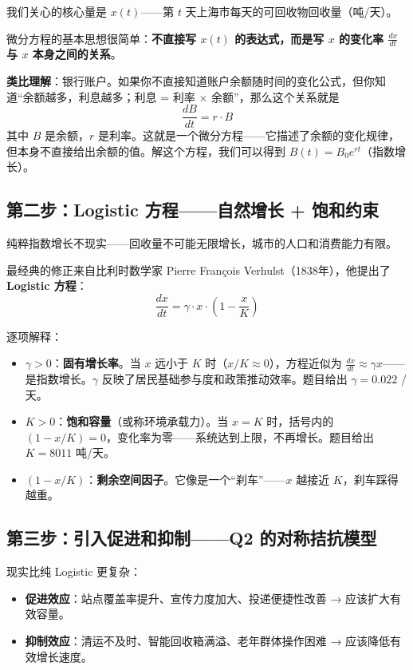 \documentclass[12pt,a4paper]{article}
\begin{document}
我们关心的核心量是 $x(t)$——第 $t$ 天上海市每天的可回收物回收量（吨/天）。

微分方程的基本思想很简单：\textbf{不直接写 $x(t)$ 的表达式，而是写 $x$ 的变化率 $\frac{dx}{dt}$ 与 $x$ 本身之间的关系}。

\medskip
\textbf{类比理解}：银行账户。如果你不直接知道账户余额随时间的变化公式，但你知道``余额越多，利息越多；利息 = 利率 $\times$ 余额''，那么这个关系就是
\[
\frac{dB}{dt} = r \cdot B
\]
其中 $B$ 是余额，$r$ 是利率。这就是一个微分方程——它描述了余额的变化规律，但本身不直接给出余额的值。解这个方程，我们可以得到 $B(t) = B_0 e^{rt}$（指数增长）。

\subsection{第二步：Logistic 方程——自然增长 + 饱和约束}

纯粹指数增长不现实——回收量不可能无限增长，城市的人口和消费能力有限。

最经典的修正来自比利时数学家 Pierre Fran\c{c}ois Verhulst（1838年），他提出了\textbf{Logistic 方程}：
\[
\frac{dx}{dt} = \gamma \cdot x \cdot \left(1 - \frac{x}{K}\right)
\]

逐项解释：
\begin{itemize}
  \item $\gamma > 0$：\textbf{固有增长率}。当 $x$ 远小于 $K$ 时（$x/K \approx 0$），方程近似为 $\frac{dx}{dt} \approx \gamma x$——是指数增长。$\gamma$ 反映了居民基础参与度和政策推动效率。题目给出 $\gamma = 0.022$ /天。
  \item $K > 0$：\textbf{饱和容量}（或称环境承载力）。当 $x = K$ 时，括号内的 $(1 - x/K) = 0$，变化率为零——系统达到上限，不再增长。题目给出 $K = 8011$ 吨/天。
  \item $(1 - x/K)$：\textbf{剩余空间因子}。它像是一个``刹车''——$x$ 越接近 $K$，刹车踩得越重。
\end{itemize}

\subsection{第三步：引入促进和抑制——Q2 的对称拮抗模型}

现实比纯 Logistic 更复杂：
\begin{itemize}
  \item \textbf{促进效应}：站点覆盖率提升、宣传力度加大、投递便捷性改善 → 应该扩大有效容量。
  \item \textbf{抑制效应}：清运不及时、智能回收箱满溢、老年群体操作困难 → 应该降低有效增长速度。
\end{itemize}
\end{document}
